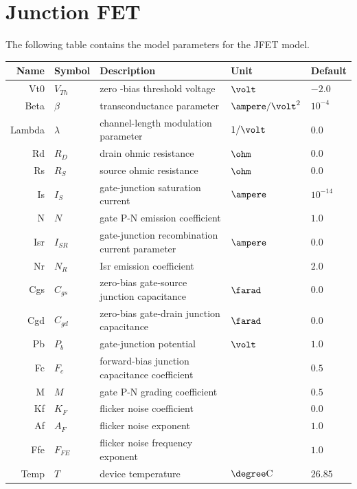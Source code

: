 \documentclass[10pt]{report}
\begin{document}
\section{Junction FET}

The following table contains the model parameters for the JFET model.

\addvspace{12pt}

\begin{tabular}{rllll}
Name & Symbol & Description & Unit & Default\\
\hline
Vt0 & $V_{Th}$ & zero -bias threshold voltage & $\volt$ & $-2.0$\\
Beta & $\beta$ & transconductance parameter & $\ampere / \volt^{2}$ & $10^{-4}$\\
Lambda & $\lambda$ & channel-length modulation parameter & $1/\volt$ & $0.0$\\
Rd & $R_{D}$ & drain ohmic resistance & $\ohm$ & $0.0$\\
Rs & $R_{S}$ & source ohmic resistance & $\ohm$ & $0.0$\\
Is & $I_{S}$ & gate-junction saturation current & $\ampere$ & $10^{-14}$\\
N & $N$ & gate P-N emission coefficient & & $1.0$\\
Isr & $I_{SR}$ & gate-junction recombination current parameter & $\ampere$ & $0.0$\\
Nr & $N_{R}$ & Isr emission coefficient & & $2.0$\\
Cgs & $C_{gs}$ & zero-bias gate-source junction capacitance & $\farad$ & $0.0$\\
Cgd & $C_{gd}$ & zero-bias gate-drain junction capacitance & $\farad$ & $0.0$\\
Pb & $P_{b}$ & gate-junction potential & $\volt$ & $1.0$\\
Fc & $F_{c}$ & forward-bias junction capacitance coefficient & & $0.5$\\
M & $M$ & gate P-N grading coefficient & & $0.5$\\
Kf & $K_F$ & flicker noise coefficient & & $0.0$\\
Af & $A_F$ & flicker noise exponent & & $1.0$\\
Ffe & $F_{FE}$ & flicker noise frequency exponent & & $1.0$\\
Temp & $T$ & device temperature & $\degree \mathrm{C}$ & $26.85$
\end{tabular}

\addvspace{12pt}
\end{document}
